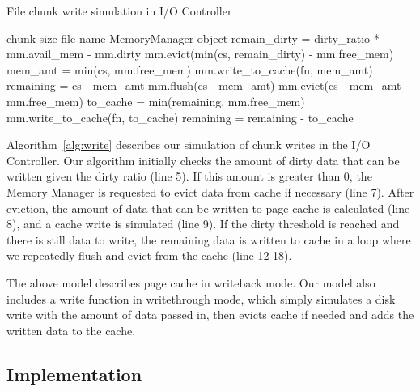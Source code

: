 \documentclass[conference]{IEEEtran}
\newcommand{\Desc}[2]{\State \makebox[2em][l]{#1}#2}
\begin{document}
    \begin{algorithm}\caption{File chunk write simulation in I/O Controller}
    \label{alg:write}
        \small
        \begin{algorithmic}[1]
            \Input
                \Desc{cs}{chunk size}
                \Desc{fn}{file name}
                \Desc{mm}{MemoryManager object}
               \EndInput
            \State remain\_dirty = dirty\_ratio * mm.avail\_mem - mm.dirty
             
                \State mm.evict(min(cs, remain\_dirty) - mm.free\_mem)
                \State mem\_amt = min(cs, mm.free\_mem)
                \State mm.write\_to\_cache(fn, mem\_amt)
            \EndIf
            \State remaining = cs - mem\_amt
              
                \State mm.flush(cs - mem\_amt)
                \State mm.evict(cs - mem\_amt  - mm.free\_mem)
                \State to\_cache = min(remaining, mm.free\_mem)
                \State mm.write\_to\_cache(fn, to\_cache)
                \State remaining = remaining - to\_cache
            \EndWhile

        \end{algorithmic}
    \end{algorithm}
    Algorithm~\ref{alg:write} describes our simulation of chunk writes in
    the I/O Controller.
    Our algorithm initially checks the  amount of dirty data that
    can be written given the dirty ratio (line 5).
    If this amount is greater than 0, the Memory Manager is requested to evict
    data from cache if necessary (line 7).
    After eviction, the amount of data that can be written to
    page cache is calculated (line 8), and a cache write is simulated (line 9).
    If the dirty threshold is reached and there is still data to write,
    the remaining data is written to cache in a loop
    where we repeatedly flush and evict from the cache (line 12-18).

    The above model describes page cache in writeback
    mode. Our model also includes a write function in writethrough mode,
    which simply simulates a disk write with the amount of data passed in,
    then evicts cache if needed and adds the written data to the cache.

        \subsection{Implementation}
\end{document}
